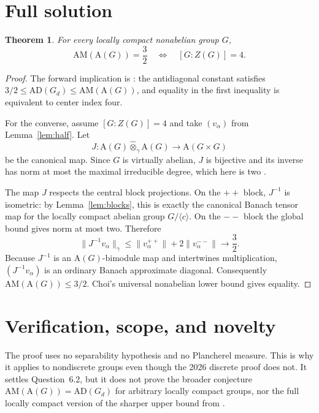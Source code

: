 \documentclass[11pt]{article}
\newtheorem{theorem}{Theorem}
\newcommand{\A}{\mathrm A}
\newcommand{\AM}{\mathrm {AM}}
\newcommand{\norm}[1]{\lVert #1\rVert}
\begin{document}
\section{Full solution}

\begin{theorem}\label{thm:main}
For every locally compact nonabelian group $G$,
\[
 \AM(\A(G))=\frac32
 \quad\Longleftrightarrow\quad
 [G:Z(G)]=4.
\]
\end{theorem}

\begin{proof}
The forward implication is \cite[Theorems 1.6 and 1.7]{Choi2023}: the
antidiagonal constant satisfies
$3/2\le \mathrm{AD}(G_d)\le\AM(\A(G))$, and equality in the first inequality
is equivalent to center index four.

For the converse, assume $[G:Z(G)]=4$ and take $(v_\alpha)$ from
Lemma~\ref{lem:half}.  Let
\[
 J:\A(G)\widehat\otimes_\gamma\A(G)\longrightarrow\A(G\times G)
\]
be the canonical map.  Since $G$ is virtually abelian, $J$ is bijective and
its inverse has norm at most the maximal irreducible degree, which here is
two \cite[Corollary 2.6 and Theorem 2.7]{Runde2006}.

The map $J$ respects the central block projections.  On the $++$ block,
$J^{-1}$ is isometric: by Lemma~\ref{lem:blocks}, this is exactly the
canonical Banach tensor map for the locally compact abelian group
$G/\langle c\rangle$.  On the $--$ block the global bound gives norm at most
two.  Therefore
\[
 \norm{J^{-1}v_\alpha}_\gamma
 \le \norm{v_\alpha^{++}}+2\norm{v_\alpha^{--}}
 \longrightarrow \frac32.
\]
Because $J^{-1}$ is an $\A(G)$-bimodule map and intertwines multiplication,
$(J^{-1}v_\alpha)$ is an ordinary Banach approximate diagonal.  Consequently
$\AM(\A(G))\le3/2$.  Choi's universal nonabelian lower bound gives equality.
\end{proof}

\section{Verification, scope, and novelty}

The proof uses no separability hypothesis and no Plancherel measure.  This is
why it applies to nondiscrete groups even though the 2026 discrete proof does
not.  It settles Question~6.2, but it does not prove the broader conjecture
$\AM(\A(G))=\mathrm{AD}(G_d)$ for arbitrary locally compact groups, nor the
full locally compact version of the sharper upper bound from
\cite{ChoiGhandehari2026}.
\end{document}
